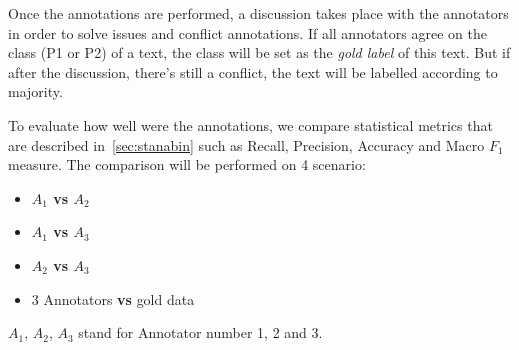 Once the annotations are performed, a discussion takes place with the annotators in order to solve issues and conflict annotations. If all annotators agree on the class (P1 or P2) of a text, the class will be set as the \emph{gold label} of this text. But if after the discussion, there's still a conflict, the text will be labelled according to majority. 

To evaluate how well were the annotations, we compare statistical metrics that are described in~\cref{sec:stanabin} such as Recall, Precision, Accuracy and Macro $F_{1}$ measure. The comparison will be performed on 4 scenario: 
\begin{itemize}
  \item \textbf{$A_1$ vs $A_2$}
  \item \textbf{$A_1$ vs $A_3$}
  \item \textbf{$A_2$ vs $A_3$}
  \item 3 Annotators \textbf{vs} \Gls{gold data}
\end{itemize}
$A_1$, $A_2$, $A_3$ stand for Annotator number 1, 2 and 3. 

